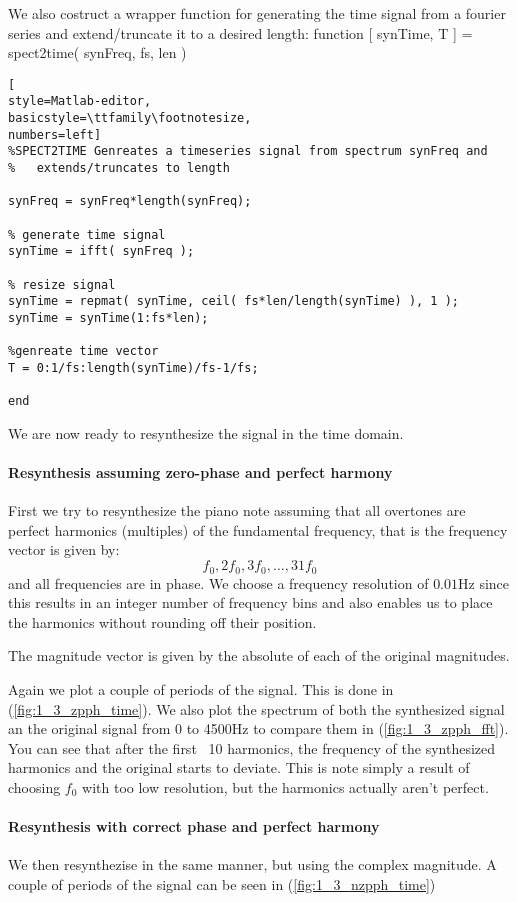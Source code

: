 We also costruct a wrapper function for generating the time signal from a
fourier series and extend/truncate it to a desired length:
function [ synTime, T ] = spect2time( synFreq, fs, len )
\begin{lstlisting}[
style=Matlab-editor,
basicstyle=\ttfamily\footnotesize,
numbers=left]
%SPECT2TIME Genreates a timeseries signal from spectrum synFreq and
%   extends/truncates to length

synFreq = synFreq*length(synFreq);

% generate time signal
synTime = ifft( synFreq );

% resize signal
synTime = repmat( synTime, ceil( fs*len/length(synTime) ), 1 );
synTime = synTime(1:fs*len);

%genreate time vector
T = 0:1/fs:length(synTime)/fs-1/fs;

end
\end{lstlisting}

We are now ready to resynthesize the signal in the time domain.
\paragraph{ Resynthesis assuming zero-phase and perfect harmony }
First we try to resynthesize the piano note assuming that all overtones are
perfect harmonics (multiples) of the fundamental frequency, that is the
frequency vector is given by:
\begin{equation*}
 f_0, 2 f_0, 3 f_0, \ldots , 31 f_0
\end{equation*}
and all frequencies are in phase.
We choose a frequency resolution of $0.01\mbox{Hz}$ since this results in an
integer number of frequency bins and also enables us to place the harmonics
without rounding off their position.

The magnitude vector is given by the absolute of each of the original
magnitudes.

Again we plot a couple of periods of the signal. This is done in
(\ref{fig:1_3_zpph_time}). We also plot the spectrum of both the synthesized
signal an the original signal from 0 to 4500Hz to compare them in
(\ref{fig:1_3_zpph_fft}). You can see that after the first ~10 harmonics, the
frequency of the synthesized harmonics and the original starts to deviate. This
is note simply a result of choosing $f_0$ with too low resolution, but the
harmonics actually aren't perfect.

\paragraph{ Resynthesis with correct phase and perfect harmony }
We then resynthezise in the same manner, but using the complex magnitude.
A couple of periods of the signal can be seen in
(\ref{fig:1_3_nzpph_time})

